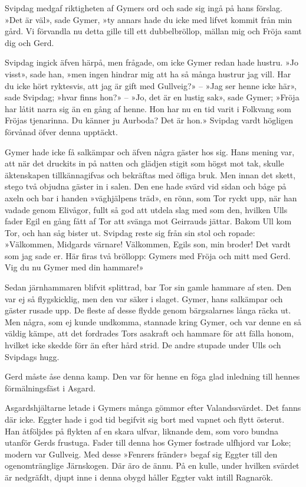 Svipdag medgaf riktigheten af Gymers ord och sade sig ingå på hans
förslag. »Det är väl», sade Gymer, »ty annars hade du icke med lifvet
kommit från min gård. Vi förvandla nu detta gille till ett
dubbelbröllop, mällan mig och Fröja samt dig och Gerd.

Svipdag ingick äfven härpå, men frågade, om icke Gymer redan hade
hustru. »Jo visst», sade han, »men ingen hindrar mig att ha så många
hustrur jag vill. Har du icke hört ryktesvis, att jag är gift med
Gullveig?» -- »Jag ser henne icke här», sade Svipdag; »hvar finns hon?»
-- »Jo, det är en lustig sak», sade Gymer; »Fröja har låtit narra sig än
en gång af henne. Hon har nu en tid varit i Folkvang som Fröjas
tjenarinna. Du känner ju Aurboda? Det är hon.» Svipdag vardt högligen
förvånad öfver denna upptäckt.

Gymer hade icke få salkämpar och äfven några gäster hos sig. Hans mening
var, att när det druckits in på natten och glädjen stigit som högst mot
tak, skulle äktenskapen tillkännagifvas och bekräftas med öfliga bruk.
Men innan det skett, stego två objudna gäster in i salen. Den ene hade
svärd vid sidan och båge på axeln och bar i handen »väghjälpens träd»,
en rönn, som Tor ryckt upp, när han vadade genom Elivågor, fullt så god
att utdela slag med som den, hvilken Ulls fader Egil en gång fått af Tor
att svänga mot Geirrauds jättar. Bakom Ull kom Tor, och han såg bister
ut. Svipdag reste sig från sin stol och ropade: »Välkommen, Midgards
värnare! Välkommen, Egils son, min broder! Det vardt som jag sade er.
Här firas två bröllopp: Gymers med Fröja och mitt med Gerd. Vig du nu
Gymer med din hammare!»

Sedan järnhammaren blifvit splittrad, bar Tor sin gamle hammare af sten.
Den var ej så flygskicklig, men den var säker i slaget. Gymer, hans
salkämpar och gäster rusade upp. De fleste af desse flydde genom
bärgsalarnes långa räcka ut. Men några, som ej kunde undkomma, stannade
kring Gymer, och var denne en så väldig kämpe, att det fordrades Tors
asakraft och hammare för att fälla honom, hvilket icke skedde förr än
efter hård strid. De andre stupade under Ulls och Svipdags hugg.

Gerd måste åse denna kamp. Den var för henne en föga glad inledning till
hennes förmälningsfäst i Asgard.

Asgardshjältarne letade i Gymers många gömmor efter Valandssvärdet. Det
fanns där icke. Eggter hade i god tid begifvit sig bort med vapnet och
flytt österut. Han åtföljdes på flykten af en skara ulfvar, liknande
dem, som voro bundna utanför Gerds frustuga. Fader till denna hos Gymer
fostrade ulfhjord var Loke; modern var Gullveig. Med desse »Fenrers
fränder» begaf sig Eggter till den ogenomtränglige Järnskogen. Där äro
de ännu. På en kulle, under hvilken svärdet är nedgräfdt, djupt inne i
denna obygd håller Eggter vakt intill Ragnarök.

